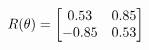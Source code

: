 \documentclass[preview]{standalone}
\begin{document}
\begin{align*}
\special{dvisvgm:raw <g id='unique000'>}R(\theta) = \begin{bmatrix}0.53 & 0.85\\-0.85 & 0.53\end{bmatrix}\special{dvisvgm:raw </g>}
\end{align*}
\end{document}
